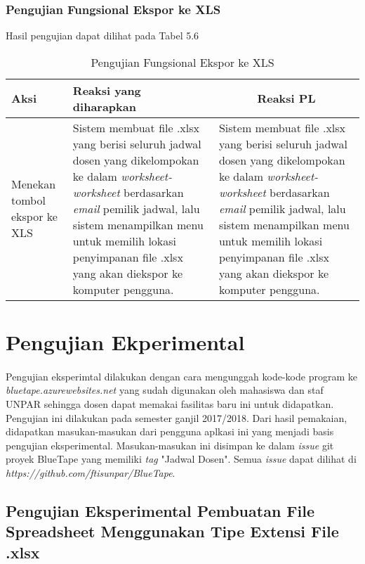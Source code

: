 \subsubsection{Pengujian Fungsional Ekspor ke XLS}
Hasil pengujian dapat dilihat pada Tabel 5.6
\begin{center}
	\begin{table}[H]
	\caption{Pengujian Fungsional Ekspor ke XLS}
		\begin{tabular}{|p{5cm}|p{5cm}|p{5cm}|}
		\hline
		\centering Aksi	& 	\centering Reaksi yang diharapkan &  \multicolumn{1}{c|}{Reaksi PL} \\
		\hline
		Menekan tombol ekspor ke XLS & 
		Sistem membuat file .xlsx yang berisi seluruh jadwal dosen yang dikelompokan ke dalam \textit{worksheet-worksheet} berdasarkan \textit{email} pemilik jadwal, lalu sistem  menampilkan menu untuk memilih lokasi penyimpanan file .xlsx yang akan diekspor ke komputer pengguna. &
		Sistem membuat file .xlsx yang berisi seluruh jadwal dosen yang dikelompokan ke dalam \textit{worksheet-worksheet} berdasarkan \textit{email} pemilik jadwal, lalu sistem  menampilkan menu untuk memilih lokasi penyimpanan file .xlsx yang akan diekspor ke komputer pengguna. \\
		\hline
		\end{tabular}
	\end{table}
\end{center}

\section{Pengujian Ekperimental}
\paragraph{}Pengujian eksperimtal dilakukan dengan cara mengunggah kode-kode program ke \textit{bluetape.azurewebsites.net} yang sudah digunakan oleh mahasiswa dan staf UNPAR sehingga dosen dapat memakai fasilitas baru ini untuk didapatkan. Pengujian ini dilakukan pada semester ganjil 2017/2018. Dari hasil pemakaian, didapatkan masukan-masukan dari pengguna aplkasi ini yang menjadi basis pengujian eksperimental. Masukan-masukan ini disimpan ke dalam \textit{issue} git proyek BlueTape yang memiliki \textit{tag} "Jadwal Dosen". Semua \textit{issue} dapat dilihat di \textit{https://github.com/ftisunpar/BlueTape}.

\subsection{Pengujian Eksperimental Pembuatan File Spreadsheet Menggunakan Tipe Extensi File .xlsx}

